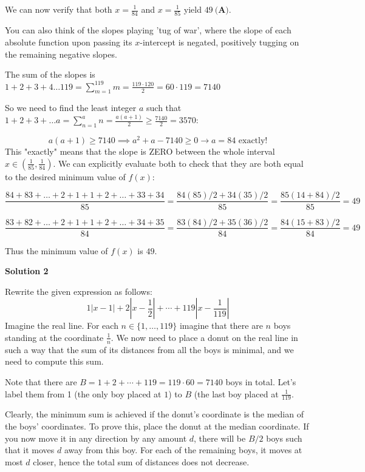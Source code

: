 \begin{enumerate}
 We can now verify that both $x=\frac{1}{84}$ and $x=\frac{1}{85}$ yield $\boxed{49\ \textbf{(A)}}$.

 You can also think of the slopes playing 'tug of war', where the slope of each absolute function upon passing its $x$-intercept is negated, positively tugging on the remaining negative slopes.

 The sum of the slopes is $1+2+3+4\dots 119=\sum_{m=1}^{119}m=\frac{119\cdot 120}{2}=60\cdot 119=7140$

 So we need to find the least integer $a$ such that $1+2+3+\dots a=\sum_{n=1}^an=\frac{a(a+1)}{2}\ge \frac{7140}{2}=3570:$

 \[a(a+1)\ge 7140\implies a^2+a-7140\ge 0\rightarrow a=84\text{ exactly!}\]This "exactly" means that the slope is ZERO between the whole interval $x\in\left(\frac{1}{85},\frac{1}{84}\right)$. We can explicitly evaluate both to check that they are both equal to the desired minimum value of $f(x)$:

 
 \[\frac{84+83+\dots+2+1+1+2+\dots+33+34}{85}=\frac{84(85)/2+34(35)/2}{85}=\frac{85(14+84)/2}{85}=49\]

 \[\frac{83+82+\dots+2+1+1+2+\dots+34+35}{84}=\frac{83(84)/2+35(36)/2}{84}=\frac{84(15+83)/2}{84}=49\]

 Thus the minimum value of $f(x)$ is $49$.

 



\textbf{Solution 2}

Rewrite the given expression as follows:
 \[1|x-1| + 2\left|x-\frac 12\right| + \cdots + 119\left|x-\frac 1{119}\right|\]Imagine the real line. For each $n\in\{1,\dots,119\}$ imagine that there are $n$ boys standing at the coordinate $\frac 1n$. We now need to place a donut on the real line in such a way that the sum of its distances from all the boys is minimal, and we need to compute this sum.

 Note that there are $B=1+2+\cdots+119 = 119\cdot 60=7140$ boys in total. Let's label them from 1 (the only boy placed at $1$) to $B$ (the last boy placed at $\frac 1{119}$.

 Clearly, the minimum sum is achieved if the donut's coordinate is the median of the boys' coordinates. To prove this, place the donut at the median coordinate. If you now move it in any direction by any amount $d$, there will be $B/2$ boys such that it moves $d$ away from this boy. For each of the remaining boys, it moves at most $d$ closer, hence the total sum of distances does not decrease.


\end{enumerate}
